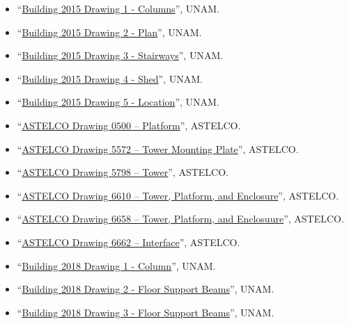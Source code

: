 \begin{flushleft}
\begin{itemize}

\ifcoatlioan
\item “\href{bibliography/unam-coatli-building-drawing-2015-1.pdf}{Building 2015 Drawing 1 - Columns}”, UNAM.
\item “\href{bibliography/unam-coatli-building-drawing-2015-2.pdf}{Building 2015 Drawing 2 - Plan}”, UNAM.
\item “\href{bibliography/unam-coatli-building-drawing-2015-3.pdf}{Building 2015 Drawing 3 - Stairways}”, UNAM.
\item “\href{bibliography/unam-coatli-building-drawing-2015-4.pdf}{Building 2015 Drawing 4 - Shed}”, UNAM.
\item “\href{bibliography/unam-coatli-building-drawing-2015-5.pdf}{Building 2015 Drawing 5 - Location}”, UNAM.
\item “\href{bibliography/astelco-enclosure-drawing-0500}{ASTELCO Drawing 0500 -- Platform}”, ASTELCO.
\item “\href{bibliography/astelco-enclosure-drawing-5772}{ASTELCO Drawing 5572 -- Tower Mounting Plate}”, ASTELCO.
\item “\href{bibliography/astelco-enclosure-drawing-5772}{ASTELCO Drawing 5798 -- Tower}”, ASTELCO.
\item “\href{bibliography/astelco-enclosure-drawing-5772}{ASTELCO Drawing 6610 --  Tower, Platform, and Enclosure}”, ASTELCO.
\item “\href{bibliography/astelco-enclosure-drawing-5772}{ASTELCO Drawing 6658 -- Tower, Platform, and Enclosuure}”, ASTELCO.
\item “\href{bibliography/astelco-enclosure-drawing-5772}{ASTELCO Drawing 6662 -- Interface}”, ASTELCO.
\item “\href{bibliography/unam-coatli-building-drawing-2018-1.pdf}{Building 2018 Drawing 1 - Column}”, UNAM.
\item “\href{bibliography/unam-coatli-building-drawing-2018-2.pdf}{Building 2018 Drawing 2 - Floor Support Beams}”, UNAM.
\item “\href{bibliography/unam-coatli-building-drawing-2018-3.pdf}{Building 2018 Drawing 3 - Floor Support Beams}”, UNAM.
\fi


\end{itemize}
\end{flushleft}
